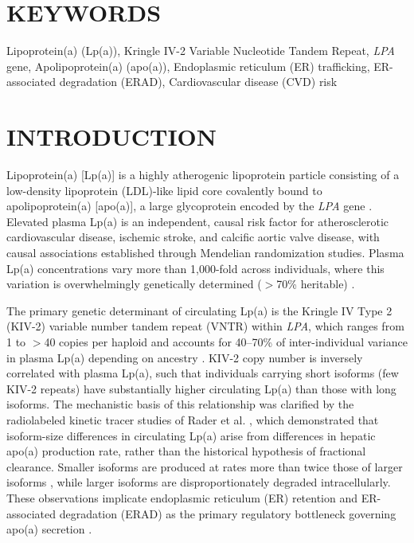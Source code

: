 \documentclass[12pt,letterpaper]{article}
\begin{document}
\section*{KEYWORDS}

Lipoprotein(a) (Lp(a)),
Kringle IV-2 Variable Nucleotide Tandem Repeat,
\textit{LPA} gene,
Apolipoprotein(a) (apo(a)),
Endoplasmic reticulum (ER) trafficking,
ER-associated degradation (ERAD),
Cardiovascular disease (CVD) risk

\newpage

\section{INTRODUCTION}

Lipoprotein(a) [Lp(a)] is a highly atherogenic lipoprotein particle consisting of a low-density lipoprotein (LDL)-like lipid core covalently bound to apolipoprotein(a) [apo(a)], a large glycoprotein encoded by the \textit{LPA} gene \citep{tsimikas2012lipoprotein,lamon1991nhlbi,reyes2022lipoprotein}. Elevated plasma Lp(a) is an independent, causal risk factor for atherosclerotic cardiovascular disease\citep{reyes2022lipoprotein}, ischemic stroke\citep{nave2015lipoprotein}, and calcific aortic valve disease\citep{stewart1997clinical}, with causal associations established through Mendelian randomization studies\citep{kamstrup2009genetically,clarke2009genetic,coassin2019comprehensive}. Plasma Lp(a) concentrations vary more than 1,000-fold across individuals, where this variation is overwhelmingly genetically determined ($>$70\% heritable) \citep{tsimikas2012lipoprotein,graham2016antisense}.

The primary genetic determinant of circulating Lp(a) is the Kringle IV Type 2 (KIV-2) variable number tandem repeat (VNTR) within \textit{LPA}, which ranges from 1 to $>$40 copies per haploid and accounts for 40--70\% of inter-individual variance in plasma Lp(a) depending on ancestry \citep{schmidt2016structure,utermann1987lp}. KIV-2 copy number is inversely correlated with plasma Lp(a), such that individuals carrying short isoforms (few KIV-2 repeats) have substantially higher circulating Lp(a) than those with long isoforms\citep{mukamel2021protein}. The mechanistic basis of this relationship was clarified by the radiolabeled kinetic tracer studies of Rader et al. \citep{rader1993variation,rader1994inverse}, which demonstrated that isoform-size differences in circulating Lp(a) arise from differences in hepatic apo(a) production rate, rather than the historical hypothesis of fractional clearance. Smaller isoforms are produced at rates more than twice those of larger isoforms \citep{rader1994inverse}, while larger isoforms are disproportionately degraded intracellularly\citep{rader1993variation}. These observations implicate endoplasmic reticulum (ER) retention and ER-associated degradation (ERAD) as the primary regulatory bottleneck governing apo(a) secretion \citep{rader1993variation,rader1994inverse, white1994intracellular, white1994molecular}.
\end{document}
